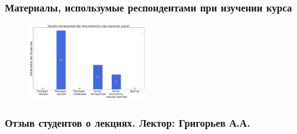 	\subsubsection{Материалы, использумые респондентами при изучении курса}

		\begin{figure}[H]
			\centering
			\includegraphics[width = 0.45\textwidth]{images/4 course/Теория информации/materials.png}
		\end{figure}

	\subsubsection{Отзыв студентов о лекциях. Лектор: Григорьев А.А.}

